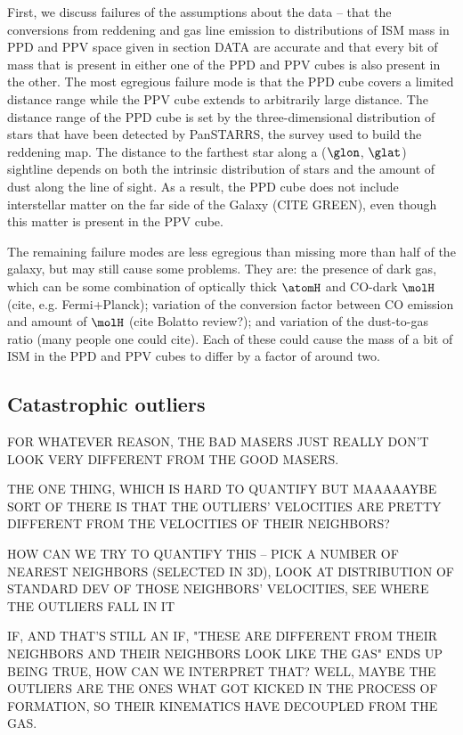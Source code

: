 First, we discuss failures of the assumptions about the data -- that the conversions from reddening and gas line emission to distributions of ISM mass in PPD and PPV space given in section DATA are accurate and that every bit of mass that is present in either one of the PPD and PPV cubes is also present in the other. 
The most egregious failure mode is that the PPD cube covers a limited distance range while the PPV cube extends to arbitrarily large distance. 
The distance range of the PPD cube is set by the three-dimensional distribution of stars that have been detected by PanSTARRS, the survey used to build the reddening map.
The distance to the farthest star along a ($\glon$, $\glat$) sightline depends on both the intrinsic distribution of stars and the amount of dust along the line of sight. 
As a result, the PPD cube does not include interstellar matter on the far side of the Galaxy (CITE GREEN), even though this matter is present in the PPV cube.

The remaining failure modes are less egregious than missing more than half of the galaxy, but may still cause some problems.
They are: the presence of dark gas, which can be some combination of optically thick $\atomH$ and CO-dark $\molH$ (cite, e.g. Fermi+Planck); variation of the conversion factor between CO emission and amount of $\molH$ (cite Bolatto review?); and variation of the dust-to-gas ratio (many people one could cite). 
Each of these could cause the mass of a bit of ISM in the PPD and PPV cubes to differ by a factor of around two.




\subsection{Catastrophic outliers}
\label{sec:discussion-catastrophic}
FOR WHATEVER REASON, THE BAD MASERS JUST REALLY DON'T LOOK VERY DIFFERENT FROM THE GOOD MASERS. 

THE ONE THING, WHICH IS HARD TO QUANTIFY BUT MAAAAAYBE SORT OF THERE IS THAT THE OUTLIERS' VELOCITIES ARE PRETTY DIFFERENT FROM THE VELOCITIES OF THEIR NEIGHBORS? 

HOW CAN WE TRY TO QUANTIFY THIS -- PICK A NUMBER OF NEAREST NEIGHBORS (SELECTED IN 3D), LOOK AT DISTRIBUTION OF STANDARD DEV OF THOSE NEIGHBORS' VELOCITIES, SEE WHERE THE OUTLIERS FALL IN IT

IF, AND THAT'S STILL AN IF, "THESE ARE DIFFERENT FROM THEIR NEIGHBORS AND THEIR NEIGHBORS LOOK LIKE THE GAS" ENDS UP BEING TRUE, HOW CAN WE INTERPRET THAT? WELL, MAYBE THE OUTLIERS ARE THE ONES WHAT GOT KICKED IN THE PROCESS OF FORMATION, SO THEIR KINEMATICS HAVE DECOUPLED FROM THE GAS.

